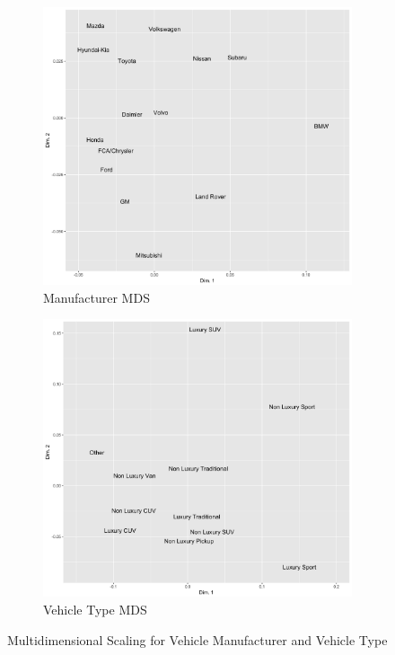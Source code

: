 \documentclass[11pt, oneside,titlepage]{article}   	%
\begin{document}
\begin{figure}[H]
\centering
\begin{subfigure}{.5\textwidth}
	\centering
	\includegraphics[width=1\linewidth]{ManufacturerMDSPlot.png}
	\caption{Manufacturer MDS}
	\label{fig:sub1}
\end{subfigure}%
\begin{subfigure}{.5\textwidth}
  \centering
  \includegraphics[width=1\linewidth]{VehicleTypeMDSPlot.png}
  \caption{Vehicle Type MDS}
  \label{fig:sub2}
\end{subfigure}
\caption{Multidimensional Scaling for Vehicle Manufacturer and Vehicle Type}
\label{fig:test}
\end{figure}
\end{document}
